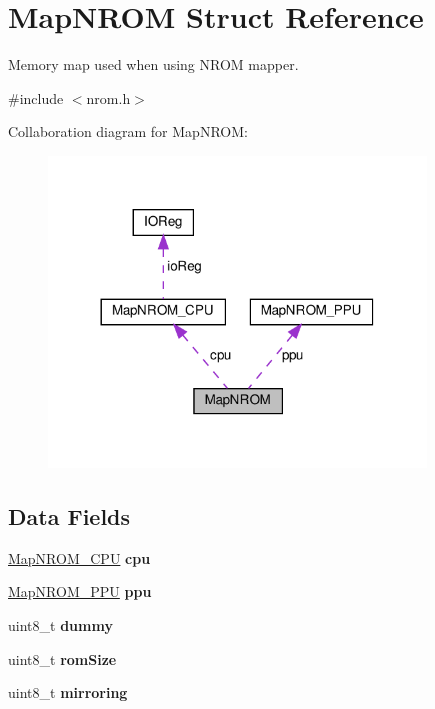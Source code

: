 \hypertarget{struct_map_n_r_o_m}{}\section{Map\+N\+R\+OM Struct Reference}
\label{struct_map_n_r_o_m}


Memory map used when using N\+R\+OM mapper.  




{\ttfamily \#include $<$nrom.\+h$>$}



Collaboration diagram for Map\+N\+R\+OM\+:\nopagebreak
\begin{figure}[H]
\begin{center}
\leavevmode
\includegraphics[width=284pt]{struct_map_n_r_o_m__coll__graph}
\end{center}
\end{figure}
\subsection*{Data Fields}
\begin{DoxyCompactItemize}
\item 
\mbox{\label{struct_map_n_r_o_m_ab87ce31650d5ba5e7e2b656779561256}} 
\hyperlink{struct_map_n_r_o_m___c_p_u}{Map\+N\+R\+O\+M\+\_\+\+C\+PU} {\bfseries cpu}
\item 
\mbox{\label{struct_map_n_r_o_m_a01d9d5e915588759aaa5863846887cb2}} 
\hyperlink{struct_map_n_r_o_m___p_p_u}{Map\+N\+R\+O\+M\+\_\+\+P\+PU} {\bfseries ppu}
\item 
\mbox{\label{struct_map_n_r_o_m_aff7b59f569ec689a7580bd6911daafd5}} 
uint8\+\_\+t {\bfseries dummy}
\item 
\mbox{\label{struct_map_n_r_o_m_abc17b83f6b13b83428472dfa9221bfb5}} 
uint8\+\_\+t {\bfseries rom\+Size}
\item 
\mbox{\label{struct_map_n_r_o_m_ac46680d85e5d1611f934f355080f0375}} 
uint8\+\_\+t {\bfseries mirroring}
\end{DoxyCompactItemize}


